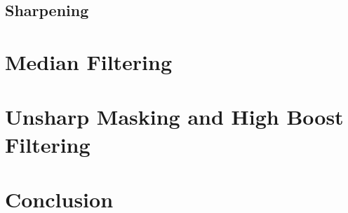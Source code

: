 \documentclass[letterpaper,10pt]{article}
\begin{document}
\subsection{Sharpening}

\section{Median Filtering}
\section{Unsharp Masking and High Boost Filtering}

\section{Conclusion}
\end{document}
